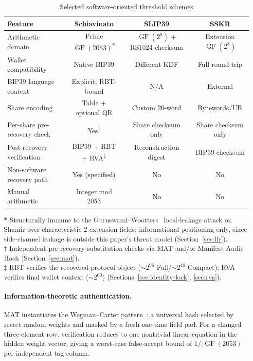 \documentclass[11pt]{article}
\newcommand{\GF}{\operatorname{GF}}
\begin{document}
\begin{table}[H]
\centering
\caption{Selected software-oriented threshold schemes}
\label{tab:electronic}
\footnotesize
\begin{tabular}{@{}lccc@{}}
\toprule
\textbf{Feature} & \textbf{Schiavinato} & \textbf{SLIP39} & \textbf{SSKR} \\ \midrule
Arithmetic domain & Prime $\GF(2053)$\textsuperscript{$\ast$} & $\GF(2^8)$ + RS1024 checksum & Extension $\GF(2^8)$ \\
Wallet compatibility & Native BIP39 & Different KDF & Full round-trip \\
BIP39 language context & Explicit; RBT-bound & N/A & External \\
Share encoding & Table + optional QR & Custom 20-word & Bytewords/UR \\
Per-share pre-recovery check & Yes\textsuperscript{$\dagger$} & Share checksum only & Share checksum only \\
Post-recovery verification & BIP39 + RBT + RVA\textsuperscript{$\ddagger$} & Reconstruction digest & BIP39 checksum \\
Non-software recovery path & Yes (specified) & No & No \\
Manual arithmetic & Integer mod 2053 & No & No \\
\bottomrule
\end{tabular}

\medskip
\footnotesize
$\ast$ Structurally immune to the Guruswami--Wootters~\cite{guruswamiwootters2016} local-leakage attack on Shamir over characteristic-2 extension fields; informational positioning only, since side-channel leakage is outside this paper's threat model (Section~\ref{sec:llr}).\\
$\dagger$ Independent pre-recovery substitution checks via MAT and/or Manifest Audit Hash (Section~\ref{sec:mat}).\\
$\ddagger$ RBT verifies the recovered protocol object (${\sim}2^{96}$ Full/${\sim}2^{48}$ Compact); RVA verifies final wallet context (${\sim}2^{60}$) (Sections~\ref{sec:identity-lock}, \ref{sec:rva}).
\end{table}

\paragraph{Information-theoretic authentication.} MAT instantiates the Wegman--Carter pattern~\cite{wegmancarter1981}: a universal hash selected by secret random weights and masked by a fresh one-time field pad. For a changed three-element row, verification reduces to one nontrivial linear equation in the hidden weight vector, giving a worst-case false-accept bound of $1/|\GF(2053)|$ per independent tag column.
\end{document}
